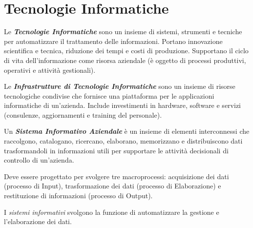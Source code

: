 \documentclass[a4paper, notitlepage, 9pt]{extreport}
\begin{document}
\section*{Tecnologie Informatiche}
Le \textit{\textbf{Tecnologie Informatiche}} sono un insieme di sistemi, strumenti e tecniche per automatizzare il trattamento delle informazioni. Portano innovazione scientifica e tecnica, riduzione dei tempi e costi di produzione. Supportano il ciclo di vita dell’informazione come risorsa aziendale (è oggetto di processi produttivi, operativi e attività gestionali).

\noindent
Le \textit{\textbf{Infrastrutture di Tecnologie Informatiche}} sono un insieme di risorse tecnologiche condivise che fornisce una piattaforma per le applicazioni informatiche di un’azienda. Include investimenti in hardware, software e servizi (consulenze, aggiornamenti e training del personale).

\noindent
Un \textit{\textbf{Sistema Informativo Aziendale}} è un insieme di elementi interconnessi che raccolgono, catalogano, ricercano, elaborano, memorizzano e distribuiscono dati trasformandoli in informazioni utili per supportare le attività decisionali di controllo di un’azienda.

Deve essere progettato per svolgere tre macroprocessi: acquisizione dei dati (processo di Input), trasformazione dei dati (processo di Elaborazione) e restituzione di informazioni (processo di Output).

I \textit{sistemi informativi} svolgono la funzione di automatizzare la gestione e l’elaborazione dei dati.
\end{document}
